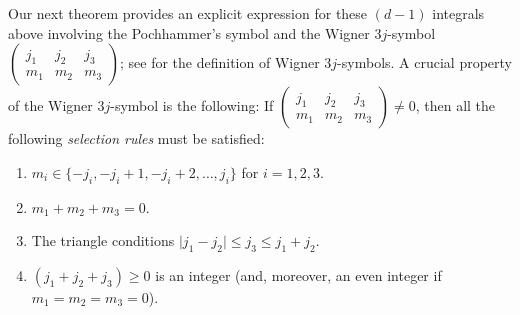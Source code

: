 \documentclass[11pt]{amsart}
\theoremstyle{definition}
\theoremstyle{plain}
\theoremstyle{remark}
\newcommand{\abs}[1]{\lvert{#1}\rvert}
\newcommand{\mat}[6]{\begin{pmatrix} #1 & #2 & #3 \\ #4 & #5 & #6 \end{pmatrix}}
\begin{document}
Our next theorem provides an explicit expression for these $(d - 1)$ integrals above involving the Pochhammer's symbol and the Wigner $3j$-symbol $\mat{j_1}{j_2}{j_3}{m_1}{m_2}{m_3}$; see \cite[Chapter 34]{NIST} for the definition of Wigner $3j$-symbols. A crucial property of the Wigner $3j$-symbol is the following: If $\mat{j_1}{j_2}{j_3}{m_1}{m_2}{m_3}\neq 0$, then all the following \emph{selection rules} must be satisfied: 
\begin{enumerate} 
\item $m_i\in\{-j_i, -j_i + 1, -j_i + 2, \dots, j_i\}$ for $i = 1, 2, 3$. 
\item $m_1 + m_2 + m_3 = 0$. 
\item The triangle conditions $\abs{j_1 - j_2}\le j_3\le j_1 + j_2$. 
\item $(j_1 + j_2 + j_3)\ge 0$ is an integer (and, moreover, an even integer if $m_1 = m_2 = m_3 = 0$). 
\end{enumerate} 
\end{document}
